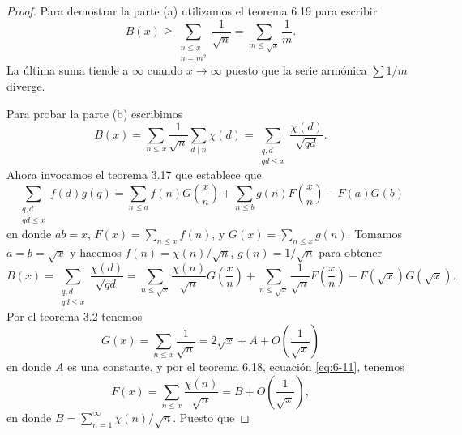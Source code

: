 \documentclass[12pt,a4paper]{book}
\begin{document}
    \begin{proof}
        Para demostrar la parte (a) utilizamos el teorema 6.19 para escribir
        \begin{equation*}
            B(x)\geq\sum_{\substack{n\leq x\\n=m^{2}}}\frac{1}{\sqrt{n}}=\sum_{m\leq\sqrt{x}}\frac{1}{m}.
        \end{equation*}
        La última suma tiende a $\infty$ cuando $x\to\infty$ puesto que la serie armónica
        $\sum1/m$ diverge.

        Para probar la parte (b) escribimos
        \begin{equation*}
            B(x)=\sum_{n\leq x}\frac{1}{\sqrt{n}}\sum_{d\mid n}\chi(d)
            =\sum_{\substack{q,d\\qd\leq x}}\frac{\chi(d)}{\sqrt{qd}}.
        \end{equation*}
        Ahora invocamos el teorema 3.17 que establece que
        \begin{equation*}
            \sum_{\substack{q,d\\qd\leq x}}f(d)g(q)=\sum_{n\leq a}f(n)G\left(\frac{x}{n}\right)
            +\sum_{n\leq b}g(n)F\left(\frac{x}{n}\right)-F(a)G(b)
        \end{equation*}
        en donde $ab=x$, $F(x)=\sum_{n\leq x}f(n)$, y $G(x)=\sum_{n\leq x}g(n)$. Tomamos
        $a=b=\sqrt{x}$ y hacemos $f(n)=\chi(n)/\sqrt{n}$, $g(n)=1/\sqrt{n}$ para obtener
        \begin{equation}\label{eq:6-12}
            B(x)=\sum_{\substack{q,d\\qd\leq x}}\frac{\chi(d)}{\sqrt{qd}}
            =\sum_{n\leq\sqrt{x}}\frac{\chi(n)}{\sqrt{n}}G\left(\frac{x}{n}\right)
            +\sum_{n\leq\sqrt{x}}\frac{1}{\sqrt{n}}F\left(\frac{x}{n}\right)
            -F(\sqrt{x})G(\sqrt{x}).
        \end{equation}
        Por el teorema 3.2 tenemos
        \begin{equation*}
            G(x)=\sum_{n\leq x}\frac{1}{\sqrt{n}}=2\sqrt{x}+A+O\left(\frac{1}{\sqrt{x}}\right)
        \end{equation*}
        en donde $A$ es una constante, y por el teorema 6.18, ecuación \eqref{eq:6-11},
        tenemos
        \begin{equation*}
            F(x)=\sum_{n\leq x}\frac{\chi(n)}{\sqrt{n}}=B+O\left(\frac{1}{\sqrt{x}}\right),
        \end{equation*}
        en donde $B=\sum_{n=1}^{\infty}\chi(n)/\sqrt{n}$. Puesto que

\end{proof}
\end{document}
